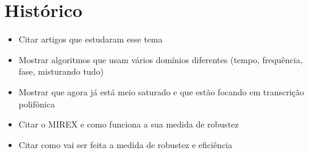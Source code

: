\section{Histórico}
\label{cap:historico}

\begin{itemize}
\item Citar artigos que estudaram esse tema
\item Mostrar algoritmos que usam vários domínios diferentes (tempo, frequência, fase, misturando tudo)
\item Mostrar que agora já está meio saturado e que estão focando em transcrição polifônica
\item Citar o MIREX e como funciona a sua medida de robustez
\item Citar como vai ser feita a medida de robustez e eficiência
\end{itemize}
